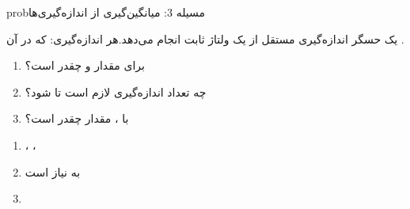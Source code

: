 \begin{PSbox}[unbreakable]{prob}{مسیله 3: میانگین‌گیری از اندازه‌گیری‌ها}

یک حسگر  اندازه‌گیری مستقل از یک ولتاژ ثابت  انجام می‌دهد.\PSbr{}هر اندازه‌گیری:  که در آن .

\begin{enumerate}
\def\labelenumi{(\alph{enumi})}
\tightlist
\item
  برای  مقدار  و  چقدر است؟
\item
  چه تعداد اندازه‌گیری  لازم است تا  شود؟
\item
  با ، مقدار  چقدر است؟
\end{enumerate}

\PSsolution{} 

\begin{enumerate}
\def\labelenumi{(\alph{enumi})}
\item
  ، ، 
\item
   به  نیاز است
\item
  \PSbr{}
\end{enumerate}

\end{PSbox}

